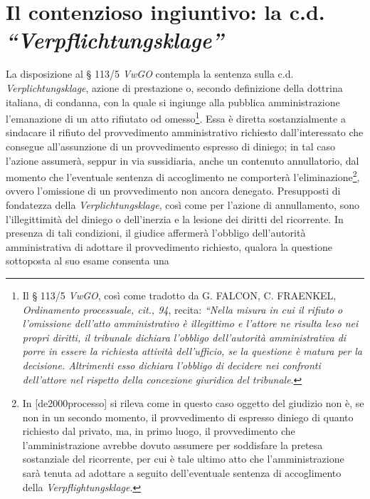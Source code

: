 \documentclass[12pt,it,a4paper,]{report}
\begin{document}
\hypertarget{il-contenzioso-ingiuntivo-la-c.d.-verpflichtungsklage}{%
\section{\texorpdfstring{Il contenzioso ingiuntivo: la c.d.
\emph{``Verpflichtungsklage''}}{Il contenzioso ingiuntivo: la c.d. ``Verpflichtungsklage''}}\label{il-contenzioso-ingiuntivo-la-c.d.-verpflichtungsklage}}

La disposizione al § 113/5 \emph{VwGO} contempla la sentenza sulla c.d.
\emph{Verplichtungsklage}, azione di prestazione o, secondo definizione
della dottrina italiana, di condanna, con la quale si ingiunge alla
pubblica amministrazione l'emanazione di un atto rifiutato od
omesso\footnote{Il § 113/5 \emph{VwGO}, così come tradotto da G. FALCON,
  C. FRAENKEL, \emph{Ordinamento processuale, cit., 94}, recita:
  \emph{``Nella misura in cui il rifiuto o l'omissione dell'atto
  amministrativo è illegittimo e l'attore ne risulta leso nei propri
  diritti, il tribunale dichiara l'obbligo dell'autorità amministrativa
  di porre in essere la richiesta attività dell'ufficio, se la questione
  è matura per la decisione. Altrimenti esso dichiara l'obbligo di
  decidere nei confronti dell'attore nel rispetto della concezione
  giuridica del tribunale}.}. Essa è diretta sostanzialmente a sindacare
il rifiuto del provvedimento amministrativo richiesto dall'interessato
che consegue all'assunzione di un provvedimento espresso di diniego; in
tal caso l'azione assumerà, seppur in via sussidiaria, anche un
contenuto annullatorio, dal momento che l'eventuale sentenza di
accoglimento ne comporterà l'eliminazione\footnote{In
  {[}de2000processo{]} si rileva come in questo caso oggetto del
  giudizio non è, se non in un secondo momento, il provvedimento di
  espresso diniego di quanto richiesto dal privato, ma, in primo luogo,
  il provvedimento che l'amministrazione avrebbe dovuto assumere per
  soddisfare la pretesa sostanziale del ricorrente, per cui è tale
  ultimo atto che l'amministrazione sarà tenuta ad adottare a seguito
  dell'eventuale sentenza di accoglimento della
  \emph{Verpflightungsklage}.}, ovvero l'omissione di un provvedimento
non ancora denegato. Presupposti di fondatezza della
\emph{Verplichtungsklage}, così come per l'azione di annullamento, sono
l'illegittimità del diniego o dell'inerzia e la lesione dei diritti del
ricorrente. In presenza di tali condizioni, il giudice affermerà
l'obbligo dell'autorità amministrativa di adottare il provvedimento
richiesto, qualora la questione sottoposta al suo esame consenta una
\end{document}
